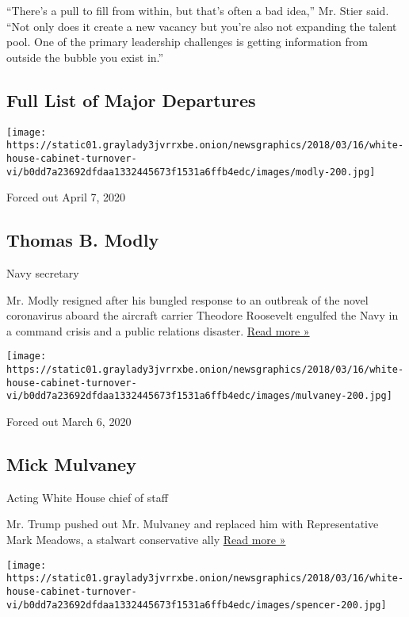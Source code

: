 ``There's a pull to fill from within, but that's often a bad idea,'' Mr.
Stier said. ``Not only does it create a new vacancy but you're also not
expanding the talent pool. One of the primary leadership challenges is
getting information from outside the bubble you exist in.''

\hypertarget{full-list-of-major-departures}{%
\subsection{Full List of Major
Departures}\label{full-list-of-major-departures}}

\texttt{[image: https://static01.graylady3jvrrxbe.onion/newsgraphics/2018/03/16/white-house-cabinet-turnover-vi/b0dd7a23692dfdaa1332445673f1531a6ffb4edc/images/modly-200.jpg]}

Forced out April 7, 2020

\hypertarget{thomas-b-modly}{%
\subsection{Thomas B. Modly}\label{thomas-b-modly}}

Navy secretary

Mr. Modly resigned after his bungled response to an outbreak of the
novel coronavirus aboard the aircraft carrier Theodore Roosevelt
engulfed the Navy in a command crisis and a public relations disaster.
\href{https://www.nytimes3xbfgragh.onion/2020/04/07/us/politics/coronavirus-navy-captain-firing.html}{Read
more »}

\texttt{[image: https://static01.graylady3jvrrxbe.onion/newsgraphics/2018/03/16/white-house-cabinet-turnover-vi/b0dd7a23692dfdaa1332445673f1531a6ffb4edc/images/mulvaney-200.jpg]}

Forced out March 6, 2020

\hypertarget{mick-mulvaney}{%
\subsection{Mick Mulvaney}\label{mick-mulvaney}}

Acting White House chief of staff

Mr. Trump pushed out Mr. Mulvaney and replaced him with Representative
Mark Meadows, a stalwart conservative ally
\href{https://www.nytimes3xbfgragh.onion/2020/03/06/us/politics/trump-mark-meadows-mick-mulvaney.html}{Read
more »}

\texttt{[image: https://static01.graylady3jvrrxbe.onion/newsgraphics/2018/03/16/white-house-cabinet-turnover-vi/b0dd7a23692dfdaa1332445673f1531a6ffb4edc/images/spencer-200.jpg]}

